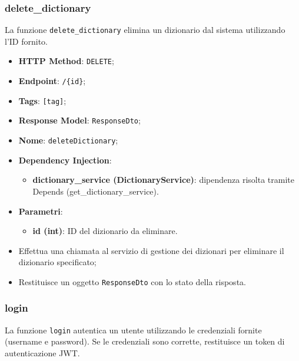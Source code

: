 \subsubsection{delete\_dictionary}

\par La funzione \texttt{delete\_dictionary} elimina un dizionario dal sistema utilizzando l'ID fornito.

  \begin{itemize}
  \item \textbf{HTTP Method}: \texttt{DELETE};
  \item \textbf{Endpoint}: \texttt{/\{id\}};
  \item \textbf{Tags}: \texttt{[tag]};
  \item \textbf{Response Model}: \texttt{ResponseDto};
  \item \textbf{Nome}: \texttt{deleteDictionary};
  \item \textbf{Dependency Injection}:
  \begin{itemize}
    \item \textbf{dictionary\_service (DictionaryService)}: dipendenza risolta tramite Depends (get\_dictionary\_service).
  \end{itemize}
    \item \textbf{Parametri}:
  \begin{itemize}
    \item \textbf{id (int)}: ID del dizionario da eliminare.
  \end{itemize}
\end{itemize}

\begin{itemize}
  \item Effettua una chiamata al servizio di gestione dei dizionari per eliminare il dizionario specificato;
  \item Restituisce un oggetto \texttt{ResponseDto} con lo stato della risposta.
\end{itemize}


\subsubsection{login}

\par La funzione \texttt{login} autentica un utente utilizzando le credenziali fornite (username e password). Se le credenziali sono corrette, restituisce un token di autenticazione JWT.

